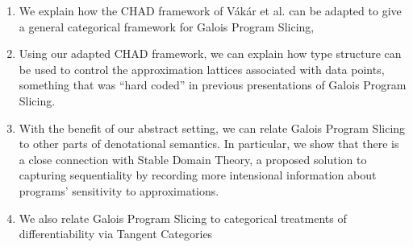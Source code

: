 \begin{enumerate}
\item We explain how the CHAD framework of Vákár et al. can be adapted to give a general categorical framework for Galois Program Slicing,
\item Using our adapted CHAD framework, we can explain how type structure can be used to control the approximation lattices associated with data points, something that was ``hard coded'' in previous presentations of Galois Program Slicing.
\item With the benefit of our abstract setting, we can relate Galois Program Slicing to other parts of denotational semantics. In particular, we show that there is a close connection with Stable Domain Theory, a proposed solution to capturing sequentiality by recording more intensional information about programs' sensitivity to approximations.
\item We also relate Galois Program Slicing to categorical treatments of differentiability via Tangent Categories 
\end{enumerate}
